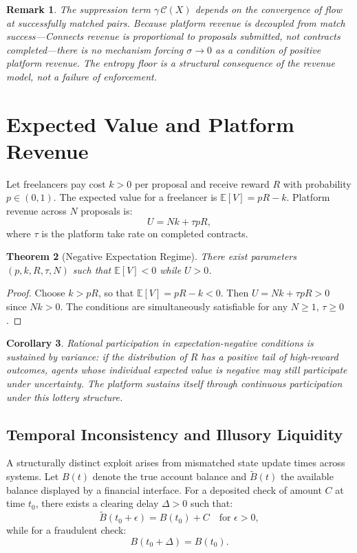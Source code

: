 \documentclass[11pt]{article}
\newtheorem{theorem}{Theorem}
\newtheorem{corollary}[theorem]{Corollary}
\newtheorem{remark}[theorem]{Remark}
\begin{document}
\begin{remark}
The suppression term $\gamma\,\mathcal{C}(X)$ depends on the convergence of
flow at successfully matched pairs. Because platform revenue is decoupled from
match success---Connects revenue is proportional to proposals submitted, not
contracts completed---there is no mechanism forcing $\sigma \to 0$ as a
condition of positive platform revenue. The entropy floor is a structural
consequence of the revenue model, not a failure of enforcement.
\end{remark}

\section{Expected Value and Platform Revenue}
\label{sec:ev}

Let freelancers pay cost $k > 0$ per proposal and receive reward $R$ with
probability $p \in (0,1)$. The expected value for a freelancer is
$\mathbb{E}[V] = pR - k$. Platform revenue across $N$ proposals is:
\[
U = Nk + \tau pR,
\]
where $\tau$ is the platform take rate on completed contracts.

\begin{theorem}[Negative Expectation Regime]
There exist parameters $(p, k, R, \tau, N)$ such that $\mathbb{E}[V] < 0$
while $U > 0$.
\end{theorem}

\begin{proof}
Choose $k > pR$, so that $\mathbb{E}[V] = pR - k < 0$. Then
$U = Nk + \tau pR > 0$ since $Nk > 0$. The conditions are simultaneously
satisfiable for any $N \geq 1$, $\tau \geq 0$.
\end{proof}

\begin{corollary}
Rational participation in expectation-negative conditions is sustained by
variance: if the distribution of $R$ has a positive tail of high-reward
outcomes, agents whose individual expected value is negative may still
participate under uncertainty. The platform sustains itself through
continuous participation under this lottery structure.
\end{corollary}


\subsection{Temporal Inconsistency and Illusory Liquidity}

A structurally distinct exploit arises from mismatched state update times
across systems. Let $B(t)$ denote the true account balance and
$\widetilde{B}(t)$ the available balance displayed by a financial interface.
For a deposited check of amount $C$ at time $t_0$, there exists a clearing
delay $\Delta > 0$ such that:
\[
\widetilde{B}(t_0 + \epsilon) = B(t_0) + C \quad \text{for } \epsilon > 0,
\]
while for a fraudulent check:
\[
B(t_0 + \Delta) = B(t_0).
\]
\end{document}
